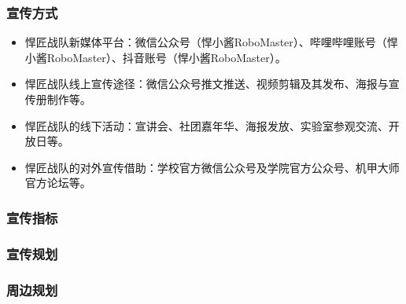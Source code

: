     \subsubsection{宣传方式}


        \begin{itemize}
            \item 悍匠战队新媒体平台：微信公众号（悍小酱RoboMaster）、哔哩哔哩账号（悍小酱RoboMaster）、抖音账号（悍小酱RoboMaster）。
            \item 悍匠战队线上宣传途径：微信公众号推文推送、视频剪辑及其发布、海报与宣传册制作等。
            \item 悍匠战队的线下活动：宣讲会、社团嘉年华、海报发放、实验室参观交流、开放日等。
            \item 悍匠战队的对外宣传借助：学校官方微信公众号及学院官方公众号、机甲大师官方论坛等。
        \end{itemize}

    \subsubsection{宣传指标}

        \noindent
    
    \subsubsection{宣传规划}

        \noindent
    
    \subsubsection{周边规划}

        